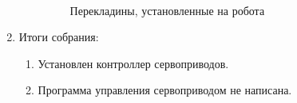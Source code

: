 \begin{enumerate}
\begin{enumerate}
      \begin{figure}[H]
      	\begin{minipage}[h]{1\linewidth}
      		\caption{Перекладины, установленные на робота} 
      	\end{minipage}
      \end{figure}
      
    \end{enumerate}
    
	\item Итоги собрания: 
	\begin{enumerate}
	  \item Установлен контроллер сервоприводов.
	  
      \item Программа управления сервоприводом не написана.
      

\end{enumerate}
\end{enumerate}
